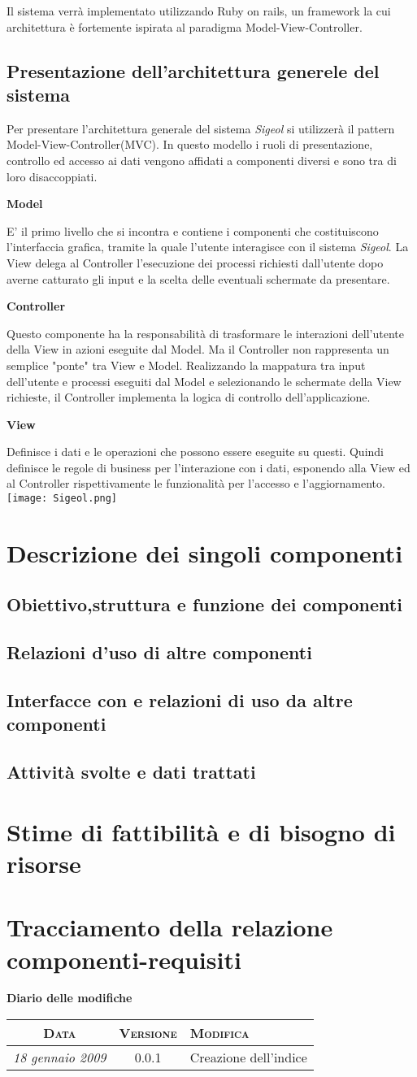\documentclass[11pt,a4paper]{article}
\newcommand{\modifiche} 
{
\newpage
\begin{center}
\textbf{Diario delle modifiche} \\
\bigskip
\begin{tabular}{|c|c|p{0.51\textwidth}|}
\hline
\textsc{Data} & \textsc{Versione} & \textsc{Modifica} \\
\hline
\hline
\textit{18 gennaio 2009} & 0.0.1 & Creazione dell'indice \\
\hline
\end{tabular}
\end{center}
}
\begin{document}
Il sistema verrà implementato utilizzando Ruby on rails, un framework la cui architettura è fortemente ispirata al paradigma Model-View-Controller. 
\subsection{Presentazione dell'architettura generele del sistema}
Per presentare l'architettura generale del sistema \textit{Sigeol} si utilizzerà il pattern Model-View-Controller(MVC).
In questo modello i ruoli di presentazione, controllo ed accesso ai dati vengono affidati a componenti diversi e sono tra di loro disaccoppiati.


\begin{center}
 \textbf{Model}
\end{center}
E' il primo livello che si incontra e contiene i componenti che costituiscono l'interfaccia grafica, tramite la quale l'utente interagisce con il sistema \textit{Sigeol}.
La View delega al Controller l'esecuzione dei processi richiesti dall'utente dopo averne catturato gli input e la
scelta delle eventuali schermate da presentare.


\begin{center}
 \textbf{Controller}
\end{center}
Questo componente ha la responsabilità di trasformare le interazioni dell'utente della View in azioni eseguite dal Model. Ma il Controller non rappresenta un semplice "ponte" tra View e Model. Realizzando la mappatura tra input dell'utente e processi eseguiti dal Model e selezionando le schermate della View richieste, il Controller implementa la logica di controllo dell'applicazione.


\begin{center}
 \textbf{View}
\end{center}
Definisce i dati e le operazioni che possono essere eseguite su questi. Quindi definisce le regole di business per l'interazione con i dati, esponendo alla View ed al Controller rispettivamente le funzionalità per l'accesso e l'aggiornamento.
\texttt{[image: Sigeol.png]}


\section{Descrizione dei singoli componenti}
\subsection{Obiettivo,struttura e funzione dei componenti}
\subsection{Relazioni d'uso di altre componenti}
\subsection{Interfacce con e relazioni di uso da altre componenti}
\subsection{Attività svolte e dati trattati}
\section{Stime di fattibilità e di bisogno di risorse}
\section{Tracciamento della relazione componenti-requisiti}
\modifiche
\end{document}
